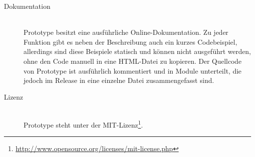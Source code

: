 \begin{description}
\item[Dokumentation] \hfill \\
Prototype besitzt eine ausführliche Online-Dokumentation. Zu jeder Funktion gibt es neben der
Beschreibung auch ein kurzes Codebeispiel, allerdings sind diese Beispiele statisch und können nicht
ausgeführt werden, ohne den Code manuell in eine HTML-Datei zu kopieren. Der Quellcode von Prototype
ist ausführlich kommentiert und in Module unterteilt, die jedoch im Release in eine einzelne Datei
zusammengefasst sind.

\item[Lizenz] \hfill \\
Prototype steht unter der
MIT-Lizenz\footnote{\href{http://www.opensource.org/licenses/mit-license.php}{http://www.opensource.org/licenses/mit-license.php}}.
\end{description}

